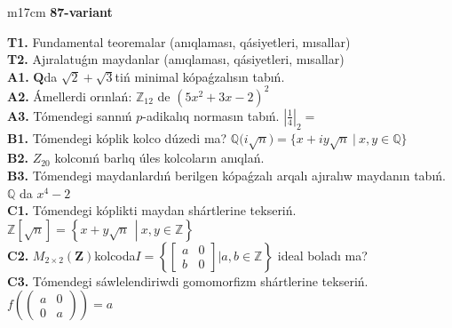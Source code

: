 \documentclass{article}
\begin{document}
\begin{tabular}{m{17cm}}
\textbf{87-variant}
\newline

\textbf{T1.} Fundamental teoremalar (anıqlaması, qásiyetleri, mısallar) \\
\textbf{T2.} Ajıralatuǵın maydanlar (anıqlaması, qásiyetleri, mısallar) \\
\textbf{A1.} \(\mathbf{Q}\)da \(\sqrt{2} + \sqrt{3}\)tiń minimal kópaǵzalısın tabıń. \\
\textbf{A2.} Ámellerdi orınlań: \(\mathbb{Z}_{12}\) de \(\left( 5x^{2} + 3x - 2 \right)^{2}\) \\
\textbf{A3.} Tómendegi sannıń \(p\)-adikalıq normasın tabıń. \(|\frac{1}{4}|_{2} =\) \\
\textbf{B1.} Tómendegi kóplik kolco dúzedi ma? \(\mathbb{Q(}i\sqrt{n}) = \{ x + iy\sqrt{n}\ |\ x,y \in \mathbb{Q}\}\) \\
\textbf{B2.} \(Z_{20}\) kolconıń barlıq úles kolcoların anıqlań. \\
\textbf{B3.} Tómendegi maydanlardıń berilgen kópaǵzalı arqalı ajıralıw maydanın tabıń. \(\mathbb{Q}\) da \(x^{4} - 2\) \\
\textbf{C1.} Tómendegi kóplikti maydan shártlerine tekseriń. \(\mathbb{Z}\left\lbrack \sqrt{n} \right\rbrack = \left\{ x + y\sqrt{n}\ \ \left| \right.\ x,y \in \mathbb{Z} \right\}\) \\
\textbf{C2.} \(M_{2 \times 2}\left( \mathbf{Z} \right)\)kolcoda\(I = \left\{ \begin{bmatrix}
a & 0 \\
b & 0
\end{bmatrix}|a,b\mathbb{\in Z} \right\}\) ideal boladı ma? \\
\textbf{C3.} Tómendegi sáwlelendiriwdi gomomorfizm shártlerine tekseriń. \(f\left( \begin{pmatrix}
a & 0 \\
0 & a
\end{pmatrix} \right) = a\) \\

\end{tabular}
\vspace{1cm}
\end{document}
